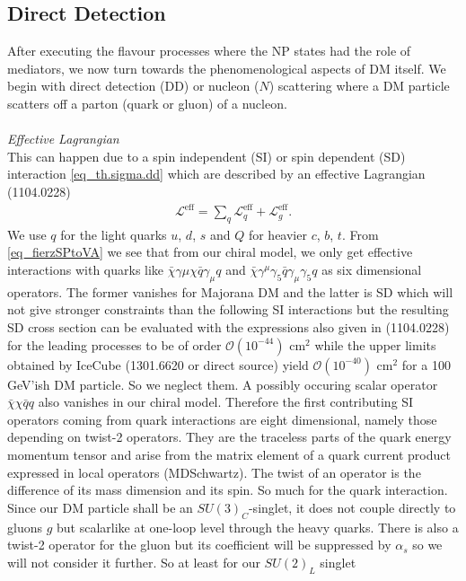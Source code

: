 \subsection{Direct Detection}
After executing the flavour processes where the NP states had the role of mediators, we now turn towards the phenomenological aspects of DM itself.
We begin with direct detection (DD) or nucleon ($N$) scattering where a DM particle scatters off a parton (quark or gluon) of a nucleon. 
\\ \\ \textit{Effective Lagrangian}\\
This can happen
due to a spin independent (SI) or spin dependent (SD) interaction \eqref{eq_th.sigma.dd} which are described by an effective Lagrangian (1104.0228)
\begin{align}
 \mathcal{L}^\text{eff} = \sum\limits_{q} \mathcal{L}^\text{eff}_q + \mathcal{L}^\text{eff}_g.
\end{align}
We use $q$ for the light quarks $u$, $d$, $s$ and $Q$ for heavier $c$, $b$, $t$. From \eqref{eq_fierzSPtoVA} we see that from our chiral model, 
we only get effective interactions with quarks like $\bar \chi\gamma\mu\chi \bar q\gamma_\mu q$ and $\bar \chi\gamma^\mu\gamma_5 \bar q\gamma_\mu \gamma_5 q$
as six dimensional operators. The former vanishes for Majorana DM and the latter is SD which will not give stronger constraints than the following SI
interactions but the resulting SD cross section can be evaluated with the expressions also given in (1104.0228) for the leading processes to be of
order $\mathcal{O}(10^{-44})$ cm$^2$ while the upper limits obtained by IceCube (1301.6620 or direct source) yield $\mathcal{O}(10^{-40})$ cm$^2$ for 
a 100 GeV'ish DM particle.
So we neglect them. A possibly occuring scalar operator $\bar \chi \chi \bar q q$ also vanishes in our chiral model. Therefore the first contributing
SI operators coming from quark interactions are eight dimensional, namely those depending on twist-2 operators. They are the traceless parts of the
quark energy momentum tensor and arise from the matrix element of a quark current product expressed in local operators (MDSchwartz). The twist of 
an operator is the difference of its mass dimension and its spin. So much for the quark interaction. Since our DM particle shall be an 
$SU(3)_C$-singlet, it does not couple directly to gluons $g$ but scalarlike at one-loop level through the heavy quarks. There is also a twist-2 
operator for the gluon but its coefficient will be suppressed by $\alpha_s$ so we will not consider it further. So at least for our $SU(2)_L$ singlet
